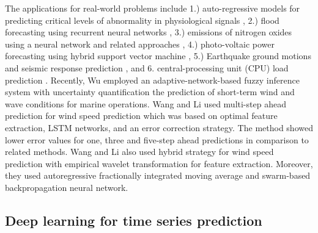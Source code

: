 \documentclass{ieeeaccess}
\begin{document}
 




 The applications  for  real-world 
problems  include 1.)  auto-regressive models   for    predicting critical levels of abnormality in 
physiological
signals \cite{TranCyber2016}, 2.) flood forecasting 
using  recurrent neural networks \cite{Chen2013Flood,Chang2014}, 3.) emissions of 
nitrogen oxides using a neural network and related approaches 
\cite{Smrekar2013Nox}, 4.) photo-voltaic power forecasting using hybrid support 
vector machine  \cite{DeGiorgi2016}, 5.) Earthquake ground motions
and seismic response prediction \cite{Yang2016}, and 6.   central-processing unit (CPU) load prediction \cite{YANG20131257}. Recently, Wu \cite{WU2019} employed an adaptive-network-based fuzzy inference system  with uncertainty quantification  the prediction of short-term wind and wave conditions for marine operations. Wang and Li \cite{WANG2018429} used  multi-step ahead prediction for wind speed prediction which was based on optimal feature extraction,   LSTM networks, and an error correction strategy. The method  showed lower error values for one, three and five-step ahead predictions in comparison to  related methods. Wang and Li \cite{WANG2019296} also used hybrid strategy for  wind speed prediction with empirical wavelet transformation for feature extraction. Moreover, they used autoregressive fractionally integrated moving average   and  swarm-based   backpropagation neural network. 







\subsection{Deep learning for time series prediction}
\end{document}
